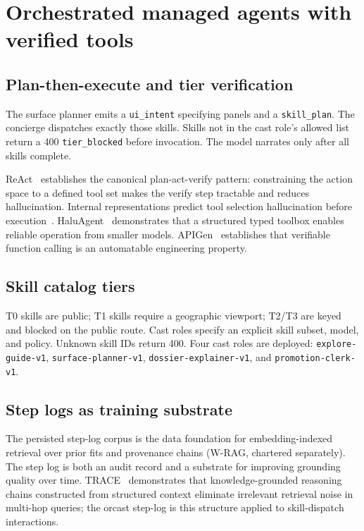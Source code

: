 \section{Orchestrated managed agents with verified tools}

\subsection{Plan-then-execute and tier verification}

The surface planner emits a \texttt{ui\_intent} specifying panels and a \texttt{skill\_plan}. The concierge dispatches exactly those skills. Skills not in the cast role's allowed list return a 400 \texttt{tier\_blocked} before invocation. The model narrates only after all skills complete.

ReAct~\cite{arxiv221003629} establishes the canonical plan-act-verify pattern: constraining the action space to a defined tool set makes the verify step tractable and reduces hallucination. Internal representations predict tool selection hallucination before execution~\cite{arxiv260105214}. HaluAgent~\cite{arxiv240611277} demonstrates that a structured typed toolbox enables reliable operation from smaller models. APIGen~\cite{arxiv240618518} establishes that verifiable function calling is an automatable engineering property.

\subsection{Skill catalog tiers}

T0 skills are public; T1 skills require a geographic viewport; T2/T3 are keyed and blocked on the public route. Cast roles specify an explicit skill subset, model, and policy. Unknown skill IDs return 400. Four cast roles are deployed: \texttt{explore-guide-v1}, \texttt{surface-planner-v1}, \texttt{dossier-explainer-v1}, and \texttt{promotion-clerk-v1}.

\subsection{Step logs as training substrate}

The persisted step-log corpus is the data foundation for embedding-indexed retrieval over prior fits and provenance chains (W-RAG, chartered separately). The step log is both an audit record and a substrate for improving grounding quality over time. TRACE~\cite{arxiv240611460} demonstrates that knowledge-grounded reasoning chains constructed from structured context eliminate irrelevant retrieval noise in multi-hop queries; the orcast step-log is this structure applied to skill-dispatch interactions.
